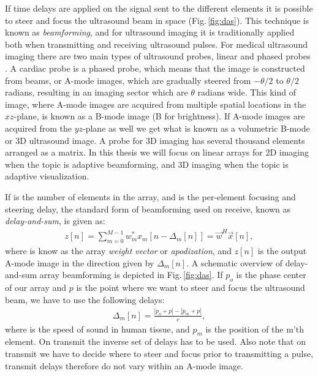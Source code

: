 If time delays are applied on the signal sent to the different elements it is possible to steer and focus the ultrasound beam in space (Fig.\,\ref{fig:das}). This technique is known as \textit{beamforming}, and for ultrasound imaging it is traditionally applied both when transmitting and receiving ultrasound pulses. For medical ultrasound imaging there are two main types of ultrasound probes, linear and phased probes \cite{AngelUltrasound}. A cardiac probe is a phased probe, which means that the image is constructed from beams, or A-mode images, which are gradually steered from $-\theta/2$ to $\theta/2$ radians, resulting in an imaging sector which are $\theta$ radians wide. This kind of image, where A-mode images are acquired from multiple spatial locations in the $xz$-plane, is known as a B-mode image (B for brightness). If A-mode images are acquired from the $yz$-plane as well we get what is known as a volumetric B-mode or 3D ultrasound image. A probe for 3D imaging has several thousand elements arranged as a matrix. In this thesis we will focus on linear arrays for 2D imaging when the topic is adaptive beamforming, and 3D imaging when the topic is adaptive visualization.

If  is the number of elements in the array, and  is the per-element focusing and steering delay, the standard form of beamforming used on receive, known as \textit{delay-and-sum}, is given as:
\begin{align}\label{eq:das}
z[n] = \sum_{m = 0}^{M-1}w_m^*x_m[n - \Delta_m[n]] = \vec{w}^H\vec{x}[n],
\end{align}
where  is know as the array \textit{weight vector} or \textit{apodization}, and $z[n]$ is the output A-mode image in the direction given by $\Delta_m[n]$.  A schematic overview of delay-and-sum array beamforming is depicted in Fig.\,\ref{fig:das}. If $p_o$ is the phase center of our array and $p$ is the point where we want to steer and focus the ultrasound beam, we have to use the following delays:
\begin{align}
\Delta_m[n] =\frac{|p_o+p| - |p_m+p|}{c},
\end{align}
where  is the speed of sound in human tissue, and $p_m$ is the position of the m'th element. On transmit the inverse set of delays has to be used. Also note that on transmit we have to decide where to steer and focus prior to transmitting a pulse, transmit delays therefore do not vary within an A-mode image.

